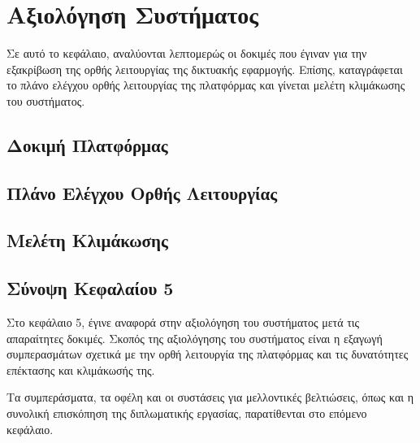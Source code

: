 \chapter{Αξιολόγηση Συστήματος}
Σε αυτό το κεφάλαιο, αναλύονται λεπτομερώς οι δοκιμές που έγιναν για την εξακρίβωση της ορθής λειτουργίας της δικτυακής εφαρμογής. Επίσης, καταγράφεται το πλάνο ελέγχου ορθής λειτουργίας της πλατφόρμας και γίνεται μελέτη κλιμάκωσης του συστήματος.

\section{Δοκιμή Πλατφόρμας}

\section{Πλάνο Ελέγχου Ορθής Λειτουργίας}

\section{Μελέτη Κλιμάκωσης}

\section{Σύνοψη Κεφαλαίου 5}
Στο κεφάλαιο 5, έγινε αναφορά στην αξιολόγηση του συστήματος μετά τις απαραίτητες δοκιμές. Σκοπός της αξιολόγησης του συστήματος είναι η εξαγωγή συμπερασμάτων σχετικά με την ορθή λειτουργία της πλατφόρμας και τις δυνατότητες επέκτασης και κλιμάκωσής της.

Τα συμπεράσματα, τα οφέλη και οι συστάσεις για μελλοντικές βελτιώσεις, όπως και η συνολική επισκόπηση της διπλωματικής εργασίας, παρατίθενται στο επόμενο κεφάλαιο.
